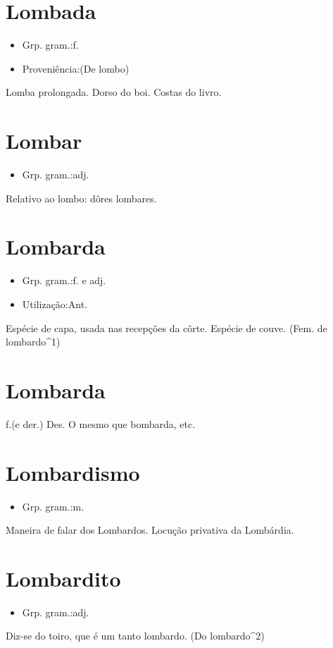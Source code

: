\section{Lombada}
\begin{itemize}
\item {Grp. gram.:f.}
\end{itemize}
\begin{itemize}
\item {Proveniência:(De \textunderscore lombo\textunderscore )}
\end{itemize}
Lomba prolongada.
Dorso do boi.
Costas do livro.
\section{Lombar}
\begin{itemize}
\item {Grp. gram.:adj.}
\end{itemize}
Relativo ao lombo: \textunderscore dôres lombares\textunderscore .
\section{Lombarda}
\begin{itemize}
\item {Grp. gram.:f.  e  adj.}
\end{itemize}
\begin{itemize}
\item {Utilização:Ant.}
\end{itemize}
Espécie de capa, usada nas recepções da côrte.
Espécie de couve.
(Fem. de \textunderscore lombardo\textunderscore ^1)
\section{Lombarda}
\textunderscore f.\textunderscore  (e der.) \textunderscore Des.\textunderscore 
O mesmo que \textunderscore bombarda\textunderscore , etc.
\section{Lombardismo}
\begin{itemize}
\item {Grp. gram.:m.}
\end{itemize}
Maneira de falar dos Lombardos.
Locução privativa da Lombárdia.
\section{Lombardito}
\begin{itemize}
\item {Grp. gram.:adj.}
\end{itemize}
Diz-se do toiro, que é um tanto lombardo.
(Do \textunderscore lombardo\textunderscore ^2)
